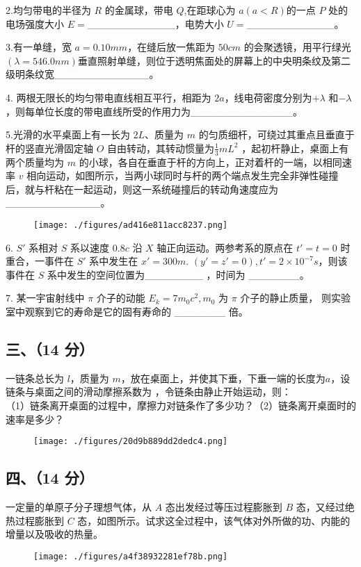 2.均匀带电的半径为 $R$ 的金属球，带电 $Q$,在距球心为 $a(a<R)$的一点 $P$ 处的电场强度大小 $E=$____________，电势大小 $U=$____________。

3.有一单缝，宽 $a=0.10mm$，在缝后放一焦距为 $50cm$ 的会聚透镜，用平行绿光$(\lambda=546.0nm)$垂直照射单缝，则位于透明焦面处的屏幕上的中央明条纹及第二级明条纹宽_____________。

4. 两根无限长的均匀带电直线相互平行，相距为 $2a$，线电荷密度分别为$+\lambda$ 和$-\lambda$ ，则每单位长度的带电直线所受的作用力为______________。

5.光滑的水平桌面上有一长为 $2L$、质量为 $m$ 的匀质细杆，可绕过其重点且垂直于杆的竖直光滑固定轴 $O$ 自由转动，其转动惯量为$\frac{1}{3}mL^2$ ，起初杆静止，桌面上有两个质量均为 $m$ 的小球，各自在垂直于杆的方向上，正对着杆的一端，以相同速率 $v$ 相向运动，如图所示，当两小球同时与杆的两个端点发生完全非弹性碰撞后，就与杆粘在一起运动，则这一系统碰撞后的转动角速度应为 _____________。
\begin{figure}[ht]
\centering
\texttt{[image: ./figures/ad416e811acc8237.png]}
\caption{} \label{fig_NJUD5_3}
\end{figure}
6. $S'$ 系相对 $S$ 系以速度 $0.8c$ 沿 $X$ 轴正向运动。两参考系的原点在 $t'=t=0$ 时重合，一事件在 $S'$ 系中发生在 $x'=300 m$. $(y'=z'=0), t'=2\times10^{-7} s$，则该事件在 $S$ 系中发生的空间位置为________ ，时间为 _______。

7. 某一宇宙射线中 $\pi$ 介子的动能 $E_k = 7 m_0 c^2,m_0$ 为 $\pi$ 介子的静止质量，  则实验室中观察到它的寿命是它的固有寿命的 _______ 倍。
\subsection{三、（14 分）}
一链条总长为 $l$，质量为 $m$，放在桌面上，并使其下垂，下垂一端的长度为$a$，设链条与桌面之间的滑动摩擦系数为 ，令链条由静止开始运动，则：\\
（1）链条离开桌面的过程中，摩擦力对链条作了多少功？（2）链条离开桌面时的速率是多少？
\begin{figure}[ht]
\centering
\texttt{[image: ./figures/20d9b889dd2dedc4.png]}
\caption{} \label{fig_NJUD5_4}
\end{figure}
\subsection{四、（14 分）}
一定量的单原子分子理想气体，从 $A$ 态出发经过等压过程膨胀到 $B$ 态，又经过绝热过程膨胀到 $C$ 态，如图所示。试求这全过程中，该气体对外所做的功、内能的增量以及吸收的热量。
\begin{figure}[ht]
\centering
\texttt{[image: ./figures/a4f38932281ef78b.png]}
\caption{} \label{fig_NJUD5_5}
\end{figure}
